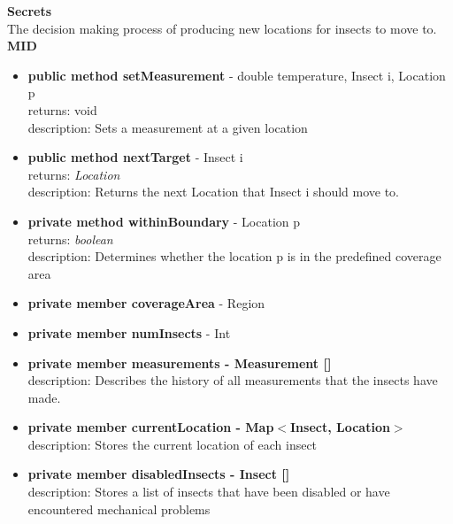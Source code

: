 \documentclass[11pt]{article}
\begin{document}
\textbf{Secrets} \\
The decision making process of producing new locations for insects to move to. \\

\textbf{MID}

\begin{itemize}
    \item \textbf{public method setMeasurement} - double temperature, Insect i, Location p \\ returns: void \\ description: Sets a measurement at a given location
    \item \textbf{public method nextTarget} - Insect i \\ returns: \textit{Location} \\ description: Returns the next Location that Insect i should move to.
    \item \textbf{private method withinBoundary} - Location p \\ returns: \textit{boolean} \\ description: Determines whether the location
    p is in the predefined coverage area
    \item \textbf{private member coverageArea} - Region
    \item \textbf{private member numInsects} - Int
    \item \textbf{private member measurements - Measurement []} \\ description: Describes the history of all measurements that the insects have made.
    \item \textbf{private member currentLocation - Map$<$Insect, Location$>$} \\ description: Stores the current location of each insect
    \item \textbf{private member disabledInsects - Insect []} \\ description: Stores a list of insects that have been disabled or have encountered mechanical problems
\end{itemize}
\end{document}
